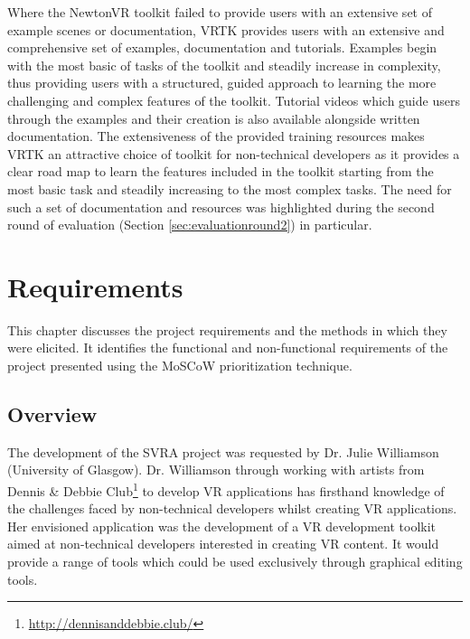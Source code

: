 \documentclass{l4proj}
\begin{document}
Where the NewtonVR toolkit failed to provide users with an extensive set of example scenes or documentation, VRTK provides users with an extensive and comprehensive set of examples, documentation and tutorials. Examples begin with the most basic of tasks of the toolkit and steadily increase in complexity, thus providing users with a structured, guided approach to learning the more challenging and complex features of the toolkit. Tutorial videos which guide users through the examples and their creation is also available alongside written documentation. The extensiveness of the provided training resources makes VRTK an attractive choice of toolkit for non-technical developers as it provides a clear road map to learn the features included in the toolkit starting from the most basic task and steadily increasing to the most complex tasks. The need for such a set of documentation and resources was highlighted during the second round of evaluation (Section \ref{sec:evaluationround2}) in particular.

\chapter{Requirements}
\label{sec:requirementschapter}
This chapter discusses the project requirements and the methods in which they were elicited. It identifies the functional and non-functional requirements of the project presented using the MoSCoW prioritization technique.

\section{Overview}
\label{sec:requirementsoverview}
The development of the SVRA project was requested by Dr. Julie Williamson (University of Glasgow). Dr. Williamson through working with artists from Dennis \& Debbie Club\footnote{\url{http://dennisanddebbie.club/}} to develop VR applications has firsthand knowledge of the challenges faced by non-technical developers whilst creating VR applications. Her envisioned application was the development of a VR development toolkit aimed at non-technical developers interested in creating VR content. It would provide a range of tools which could be used exclusively through graphical editing tools. 
\end{document}

